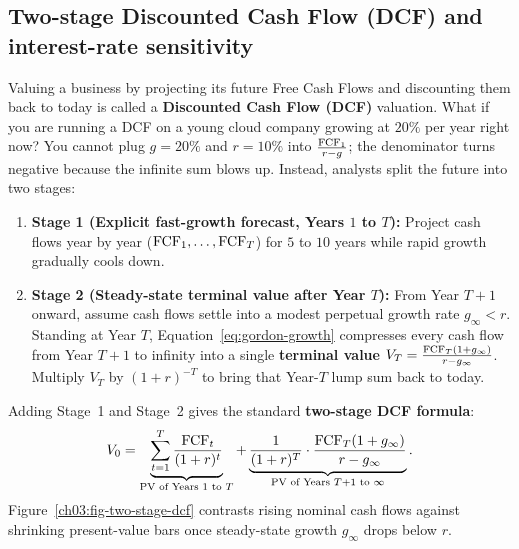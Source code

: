 \subsection{Two-stage Discounted Cash Flow (DCF) and interest-rate sensitivity}

Valuing a business by projecting its future Free Cash Flows and discounting them back to today is called a \textbf{Discounted Cash Flow (DCF)} valuation. What if you are running a DCF on a young cloud company growing at $20\%$ per year right now? You cannot plug $g = 20\%$ and $r = 10\%$ into $\frac{\operatorname{FCF}_1}{r-g}$; the denominator turns negative because the infinite sum blows up. Instead, analysts split the future into two stages:
\begin{enumerate}
 \item \textbf{Stage 1 (Explicit fast-growth forecast, Years $1$ to $T$):} Project cash flows year by year ($\operatorname{FCF}_1, \dots, \operatorname{FCF}_T$) for $5$ to $10$ years while rapid growth gradually cools down.
 \item \textbf{Stage 2 (Steady-state terminal value after Year $T$):} From Year $T+1$ onward, assume cash flows settle into a modest perpetual growth rate $g_\infty < r$. Standing at Year $T$, Equation~\eqref{eq:gordon-growth} compresses every cash flow from Year $T+1$ to infinity into a single \textbf{terminal value} $V_T = \frac{\operatorname{FCF}_T(1 + g_\infty)}{r - g_\infty}$. Multiply $V_T$ by $(1+r)^{-T}$ to bring that Year-$T$ lump sum back to today.
\end{enumerate}

Adding Stage~1 and Stage~2 gives the standard \textbf{two-stage DCF formula}:
\begin{equation}
 V_0 = \underbrace{\sum_{t=1}^{T} \frac{\operatorname{FCF}_t}{(1+r)^t}}_{\text{PV of Years } 1 \text{ to } T} + \underbrace{\frac{1}{(1+r)^T} \cdot \frac{\operatorname{FCF}_T(1 + g_\infty)}{r - g_\infty}}_{\text{PV of Years } T+1 \text{ to } \infty}.
 \label{eq:two-stage-dcf}
\end{equation}
Figure~\ref{ch03:fig-two-stage-dcf} contrasts rising nominal cash flows against shrinking present-value bars once steady-state growth $g_\infty$ drops below $r$.

